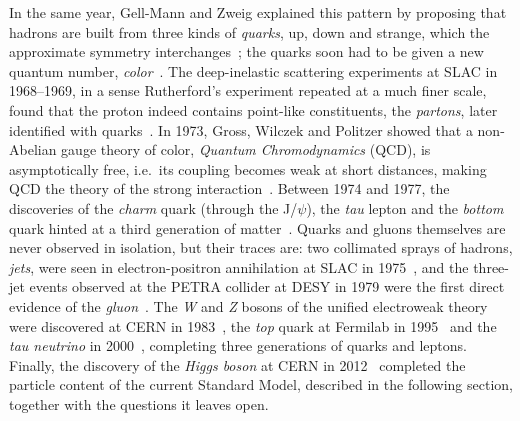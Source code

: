 In the same year, Gell-Mann and Zweig explained this pattern by proposing that hadrons are built from three kinds of \emph{quarks}, up, down and strange, which the approximate symmetry interchanges~\cite{GellMann:1964,Zweig:1964}; the quarks soon had to be given a new quantum number, \emph{color}~\cite{Greenberg:1964,HanNambu:1965}.
%
The deep-inelastic scattering experiments at SLAC in 1968--1969, in a sense Rutherford's experiment repeated at a much finer scale, found that the proton indeed contains point-like constituents, the \emph{partons}, later identified with quarks~\cite{Bloom:1969,Breidenbach:1969}.
%
In 1973, Gross, Wilczek and Politzer showed that a non-Abelian gauge theory of color, \emph{Quantum Chromodynamics} (QCD), is asymptotically free, i.e.\ its coupling becomes weak at short distances, making QCD the theory of the strong interaction~\cite{PhysRevLett.30.1343,PhysRevLett.30.1346}.
%
Between 1974 and 1977, the discoveries of the \emph{charm} quark (through the J/\(\psi\)), the \emph{tau} lepton and the \emph{bottom} quark hinted at a third generation of matter~\cite{Aubert:1974,Augustin:1974,Perl:1975,Herb:1977}.
%
Quarks and gluons themselves are never observed in isolation, but their traces are: two collimated sprays of hadrons, \emph{jets}, were seen in electron-positron annihilation at SLAC in 1975~\cite{Hanson:1975}, and the three-jet events observed at the PETRA collider at DESY in 1979 were the first direct evidence of the \emph{gluon}~\cite{TASSO:1979}.
%
The \emph{W} and \emph{Z} bosons of the unified electroweak theory were discovered at CERN in 1983~\cite{UA1W:1983,UA2W:1983,UA1Z:1983}, the \emph{top} quark at Fermilab in 1995~\cite{CDFtop:1995,D0top:1995} and the \emph{tau neutrino} in 2000~\cite{DONUT:2001}, completing three generations of quarks and leptons.
%
Finally, the discovery of the \emph{Higgs boson} at CERN in 2012~\cite{ATLASHiggs:2012,CMSHiggs:2012} completed the particle content of the current Standard Model, described in the following section, together with the questions it leaves open.


